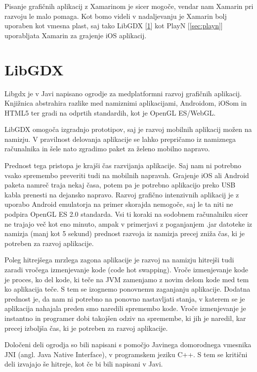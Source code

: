 Pisanje grafičnih aplikacij z Xamarinom je sicer mogoče, vendar nam Xamarin pri razvoju le malo pomaga. Kot bomo videli v nadaljevanju je Xamarin bolj uporaben kot vmesna plast, saj tako LibGDX [\ref{sec:libgdx}] kot PlayN [\ref{sec:playn}] uporabljata Xamarin za grajenje iOS aplikacij.

\section{LibGDX}
\label{sec:libgdx}
Libgdx \cite{libgdx} je v Javi napisano ogrodje za medplatformni razvoj grafičnih aplikacij. Knjižnica abstrahira razlike med namiznimi aplikacijami, Androidom, iOSom in HTML5 ter gradi na odprtih standardih, kot je OpenGL ES/WebGL.

LibGDX omogoča izgradnjo prototipov, saj je razvoj mobilnih aplikacij možen na namizju. V pravilnost delovanja aplikacije se lahko prepričamo iz namiznega računalnika in šele nato zgradimo paket za želeno mobilno napravo. 

Prednost tega pristopa je krajši čas razvijanja aplikacije. Saj nam ni potrebno vsako spremembo preveriti tudi na mobilnih napravah. Grajenje iOS ali Android paketa namreč traja nekaj časa, potem pa je potrebno aplikacijo preko USB kabla prenesti na dejansko napravo. Razvoj grafično intenzivnih aplikacij je z uporabo Android emulatorja na primer skorajda nemogoče, saj le ta niti ne podpira OpenGL ES 2.0 standarda. Vsi ti koraki na sodobnem računalniku sicer ne trajajo več kot eno minuto, ampak v primerjavi z poganjanjem .jar datoteke iz namizja (manj kot 5 sekund) prednost razvoja iz namizja precej zniža čas, ki je potreben za razvoj aplikacije.

Poleg hitrejšega mrzlega zagona aplikacije je razvoj na namizju hitrejši tudi zaradi vročega izmenjevanje kode (code hot swapping). Vroče izmenjevanje kode je proces, ko del kode, ki teče na JVM zamenjamo z novim delom kode med tem ko aplikacija teče. S tem se izognemo ponovnemu zaganjanju aplikacije. Dodatna prednost je, da nam ni potrebno na ponovno nastavljati stanja, v katerem se je aplikacija nahajala preden smo naredili spremembo kode. Vroče izmenjevanje je instantno in programer dobi takojšen odziv na spremembe, ki jih je naredil, kar precej izboljša čas, ki je potreben za razvoj aplikacije.

Določeni deli ogrodja so bili napisani s pomočjo Javinega domorodnega vmesnika JNI (angl. Java Native Interface), v programskem jeziku C++. S tem se kritični deli izvajajo še hitreje, kot če bi bili napisani v Javi.

